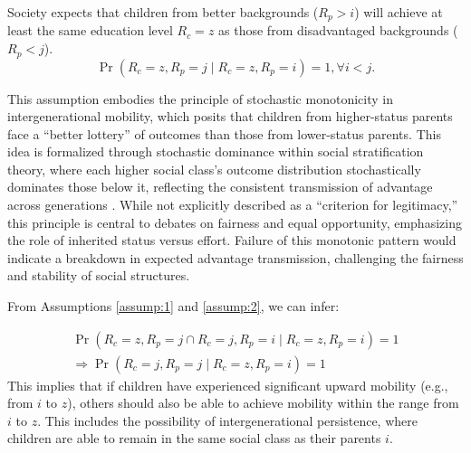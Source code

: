 \begin{assumption} \label{assump:2}
Society expects that children from better backgrounds (\( R_p > i \)) will achieve at least the same education level \( R_c = z \) as those from disadvantaged backgrounds (\( R_p < j \)).
\[
\operatorname{Pr}(R_c = z, R_p = j \mid R_c = z, R_p = i) = 1, \forall i < j.
\]
\end{assumption}
This assumption embodies the principle of stochastic monotonicity in intergenerational mobility, which posits that children from higher-status parents face a “better lottery” of outcomes than those from lower-status parents. This idea is formalized through stochastic dominance within social stratification theory, where each higher social class's outcome distribution stochastically dominates those below it, reflecting the consistent transmission of advantage across generations \citep{dardanoni2012stochastic}. While not explicitly described as a “criterion for legitimacy,” this principle is central to debates on fairness and equal opportunity, emphasizing the role of inherited status versus effort. Failure of this monotonic pattern would indicate a breakdown in expected advantage transmission, challenging the fairness and stability of social structures.

From Assumptions \ref{assump:1} and \ref{assump:2}, we can infer:

\begin{equation} \label{eq:2}
\begin{array}{l}
\operatorname{Pr}(R_c = z, R_p = j \cap R_c = j, R_p = i \mid R_c = z, R_p = i) = 1 \\
\Rightarrow \operatorname{Pr}(R_c = j, R_p = j \mid R_c = z, R_p = i) = 1
\end{array}
\end{equation}
This implies that if children have experienced significant upward mobility (e.g., from \( i \) to \( z \)), others should also be able to achieve mobility within the range from \( i \) to \( z \). This includes the possibility of intergenerational persistence, where children are able to remain in the same social class as their parents \( i \).

